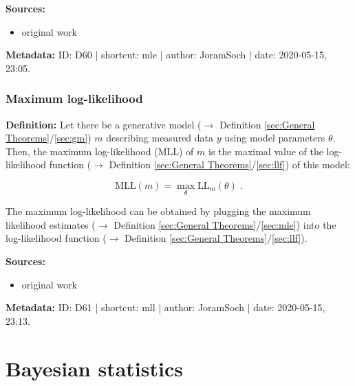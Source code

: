 \documentclass[a4paper,12pt,twoside]{book}
\begin{document}
\vspace{1em}
\textbf{Sources:}
\begin{itemize}
\item original work\end{itemize}


\vspace{1em}
\textbf{Metadata:} ID: D60 | shortcut: mle | author: JoramSoch | date: 2020-05-15, 23:05.
\vspace{1em}



\subsubsection[\textit{Maximum log-likelihood}]{Maximum log-likelihood} \label{sec:mll}
\setcounter{equation}{0}

\textbf{Definition:} Let there be a generative model ($\rightarrow$ Definition \ref{sec:General Theorems}/\ref{sec:gm}) $m$ describing measured data $y$ using model parameters $\theta$. Then, the maximum log-likelihood (MLL) of $m$ is the maximal value of the log-likelihood function ($\rightarrow$ Definition \ref{sec:General Theorems}/\ref{sec:llf}) of this model:

\begin{equation} \label{eq:mll-mll}
\mathrm{MLL}(m) = \operatorname*{max}_\theta \mathrm{LL}_m(\theta) \; .
\end{equation}

The maximum log-likelihood can be obtained by plugging the maximum likelihood estimates ($\rightarrow$ Definition \ref{sec:General Theorems}/\ref{sec:mle}) into the log-likelihood function ($\rightarrow$ Definition \ref{sec:General Theorems}/\ref{sec:llf}).


\vspace{1em}
\textbf{Sources:}
\begin{itemize}
\item original work\end{itemize}


\vspace{1em}
\textbf{Metadata:} ID: D61 | shortcut: mll | author: JoramSoch | date: 2020-05-15, 23:13.
\vspace{1em}



\pagebreak
\section{Bayesian statistics}
\end{document}
